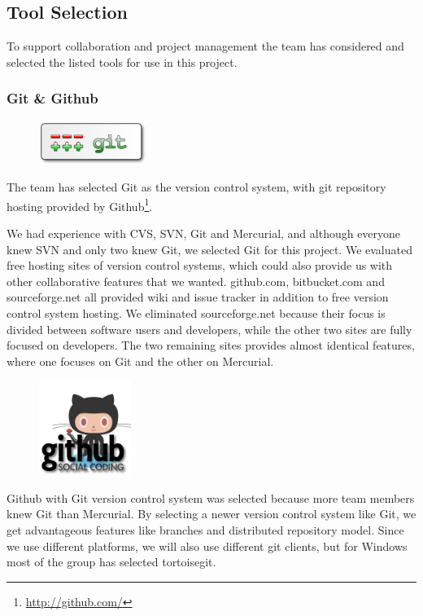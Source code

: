 \subsection{Tool Selection}
To support collaboration and project management the team has considered and
selected the listed tools for use in this project.

\subsubsection{Git \& Github}
\begin{figure}
	\vspace{-20pt}
	\includegraphics[width=3.5cm]{./planning/img/git_logo}
	\vspace{-20pt}
\end{figure}
The team has selected Git as the version control system, with git repository
hosting provided by Github\footnote{\url{http://github.com/}}.

We had experience with CVS, SVN, Git and Mercurial, and although everyone 
knew SVN and only two knew Git, we selected Git for this project. We 
evaluated free hosting sites of version control systems, which could also 
provide us with other collaborative features that we wanted. github.com, 
bitbucket.com and sourceforge.net all provided wiki and issue tracker in 
addition to free version control system hosting. We eliminated 
sourceforge.net because their focus is divided between software users and 
developers, while the other two sites are fully focused on developers. The 
two remaining sites provides almost identical features, where one focuses on 
Git and the other on Mercurial.
\begin{figure}
	\vspace{-20pt}
	\includegraphics[width=3cm]{./planning/img/github_logo}
	\vspace{-20pt}
\end{figure}

Github with Git version control system was selected because more team members
knew Git than Mercurial. By selecting a newer version control system like Git,
we get advantageous features like branches and distributed repository model.
Since we use different platforms, we will also use different git clients, but
for Windows most of the group has selected tortoisegit.

